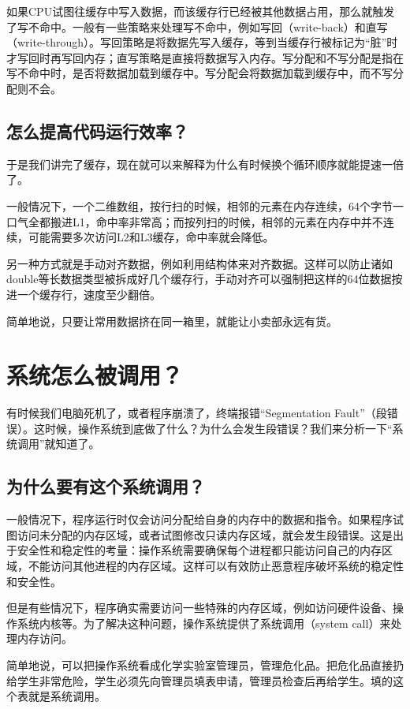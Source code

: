 \documentclass[../main.tex]{subfiles}
\begin{document}
如果CPU试图往缓存中写入数据，而该缓存行已经被其他数据占用，那么就触发了写不命中。一般有一些策略来处理写不命中，例如写回（write-back）和直写（write-through）。写回策略是将数据先写入缓存，等到当缓存行被标记为“脏”时才写回时再写回内存；直写策略是直接将数据写入内存。写分配和不写分配是指在写不命中时，是否将数据加载到缓存中。写分配会将数据加载到缓存中，而不写分配则不会。

\subsection{怎么提高代码运行效率？}
于是我们讲完了缓存，现在就可以来解释为什么有时候换个循环顺序就能提速一倍了。

一般情况下，一个二维数组，按行扫的时候，相邻的元素在内存连续，64个字节一口气全都搬进L1，命中率非常高；而按列扫的时候，相邻的元素在内存中并不连续，可能需要多次访问L2和L3缓存，命中率就会降低。

另一种方式就是手动对齐数据，例如利用结构体来对齐数据。这样可以防止诸如double等长数据类型被拆成好几个缓存行，手动对齐可以强制把这样的64位数据按进一个缓存行，速度至少翻倍。

简单地说，只要让常用数据挤在同一箱里，就能让小卖部永远有货。

\section{系统怎么被调用？}

有时候我们电脑死机了，或者程序崩溃了，终端报错“Segmentation Fault”（段错误）。这时候，操作系统到底做了什么？为什么会发生段错误？我们来分析一下“系统调用”就知道了。

\subsection{为什么要有这个系统调用？}

一般情况下，程序运行时仅会访问分配给自身的内存中的数据和指令。如果程序试图访问未分配的内存区域，或者试图修改只读内存区域，就会发生段错误。这是出于安全性和稳定性的考量：操作系统需要确保每个进程都只能访问自己的内存区域，不能访问其他进程的内存区域。这样可以有效防止恶意程序破坏系统的稳定性和安全性。

但是有些情况下，程序确实需要访问一些特殊的内存区域，例如访问硬件设备、操作系统内核等。为了解决这种问题，操作系统提供了系统调用（system call）来处理内存访问。

简单地说，可以把操作系统看成化学实验室管理员，管理危化品。把危化品直接扔给学生非常危险，学生必须先向管理员填表申请，管理员检查后再给学生。填的这个表就是系统调用。
\end{document}
